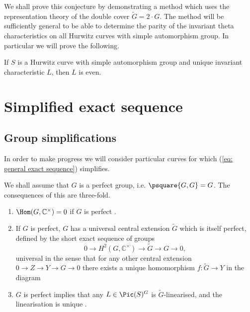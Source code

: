 \documentclass{amsart}
\begin{document}
We shall prove this conjecture by demonstrating a method which uses the representation theory of the double cover $\tilde{G} = 2 \cdot G$. The method will be sufficiently general to be able to determine the parity of the invariant theta characteristics on all Hurwitz curves with simple automorphism group. In particular we will prove the following. 

\begin{theorem}\label{thm: parity of UIC on simple Hurwitz}
    If $S$ is a Hurwitz curve with simple automorphism group and unique invariant characteristic $L$, then $L$ is even.
\end{theorem}


\section{Simplified exact sequence}\label{sec: simplified sequence}

\subsection{Group simplifications}

In order to make progress we will consider particular curves for which (\ref{eq: general exact sequence}) simplifies. 


We shall assume that $G$ is a perfect group, i.e. $\psquare{G, G} = G$. The consequences of this are three-fold.
\begin{enumerate}
    \item $\Hom(G, \mathbb{C}^\times)=0$ if $G$ is perfect \cite{Huppert2025}. 
    \item If $G$ is perfect, $G$ has a universal central extension $\tilde{G}$ which is itself perfect, defined by the short exact sequence of groups \cite[\S6.9]{Weibel1995} 
    \[
    0 \to H^2(G, \mathbb{C}^\times) \to \tilde{G} \to G \to 0,
    \]
    universal in the sense that for any other central extension $0 \to Z \to Y \to G \to 0$ there exists a unique homomorphism $f:\tilde{G} \to Y$ in the diagram
    \begin{center}
    \end{center}
    \item $G$ is perfect implies that any $L \in \Pic(S)^G$ is $\tilde{G}$-linearised, and the linearisation is unique \cite[Corollary 1.2]{Dolgachev1997a}. 
\end{enumerate}
\end{document}
